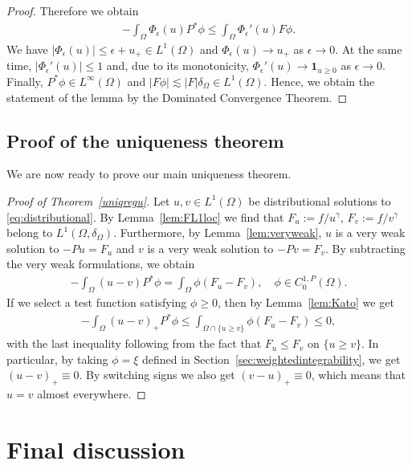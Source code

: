 \documentclass[12pt,a4paper]{amsart}
\theoremstyle{definition}
\begin{document}
\begin{proof}
    Therefore we obtain
    \begin{align*}
        -\int_\Omega \Phi_\epsilon(u) P^\ast \phi \leq \int_\Omega \Phi_\epsilon'(u) F\phi.
    \end{align*}
    We have $|\Phi_\epsilon(u)|\leq \epsilon + u_+  \in L^1(\Omega)$ and $\Phi_\epsilon(u) \to u_+$ as $\epsilon\to 0$. At the same time, $|\Phi_\epsilon'(u)|\leq 1$ and, due to its monotonicity, $\Phi_\epsilon'(u) \to\textbf{1}_{u\geq 0}$ as $\epsilon\to 0$. Finally, $P^\ast \phi \in L^{\infty}(\Omega)$ and $|F\phi|\lesssim |F|\delta_\Omega\in L^1(\Omega)$. Hence, we obtain the statement of the lemma by the Dominated Convergence Theorem. 
\end{proof}

\subsection{Proof of the uniqueness theorem}
We are now ready to prove our main uniqueness theorem.

\begin{proof}[Proof of Theorem~\ref{uniqregu}]
    Let $u,v\in L^1(\Omega)$ be distributional solutions to \eqref{eq:distributional}. By Lemma~\ref{lem:FL1loc} we find that $F_u := f/u^\gamma$, $F_v:= f/v^\gamma$ belong to $L^1(\Omega,\delta_\Omega)$. Furthermore, by Lemma~\ref{lem:veryweak}, $u$ is a very weak solution to $-Pu = F_u$ and $v$ is a very weak solution to $-Pv = F_v$. By subtracting the very weak formulations, we obtain
    \begin{align*}
        -\int_\Omega (u-v)P^* \phi = \int_\Omega \phi(F_u - F_v),\quad \phi\in C^{1,P}_0(\Omega).
    \end{align*}
    If we select a test function satisfying $\phi\geq 0$, then by Lemma~\ref{lem:Kato} we get
    \begin{align*}
        -\int_\Omega (u-v)_+P^* \phi \leq \int_{\Omega\cap\{u\geq v\}} \phi(F_u - F_v)\leq 0,
    \end{align*}
    with the last inequality following from the fact that $F_u\leq F_v$ on $\{u\geq v\}$. In particular, by taking $\phi = \xi$  defined in Section~\ref{sec:weightedintegrability}, we get $(u-v)_+ \equiv 0$. By switching signs we also get $(v-u)_+ \equiv 0$, which means that $u=v$ almost everywhere.
\end{proof}

\section{Final discussion}\label{sec:discussion}
\end{document}
